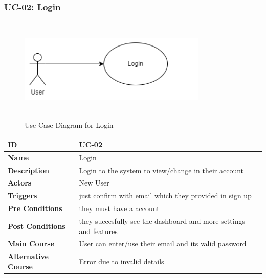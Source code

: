 \subsubsection{UC-02: Login}
\begin{figure}[H]
    \includegraphics[height=5cm, width=0.8\textwidth]{./diagrams/Use Case/u2.png}
    \centering
    \caption{Use Case Diagram for Login}
    \label{Usecase1}
\end{figure}


\begin{center}
    \begin{tabularx}{\textwidth}{|l|X|}
        \hline
        \textbf{ID}                 & UC-02                                                             \\
        \hline
        \textbf{Name}               & Login                                                             \\
        \hline
        \textbf{Description}        & Login to the system to view/change in their account               \\
        \hline
        \textbf{Actors}             & New User                                                          \\
        \hline
        \textbf{Triggers}           & just confirm with email which they provided in sign up            \\
        \hline
        \textbf{Pre Conditions}     & they must have a account                                          \\
        \hline
        \textbf{Post Conditions}    & they succesfully see the dashboard and more settings and features \\
        \hline
        \textbf{Main Course}        & User can enter/use their email and its valid password             \\
        \hline
        \textbf{Alternative Course} & Error due to invalid details                                      \\
        \hline
    \end{tabularx}
\end{center}
\newpage


